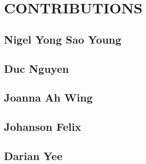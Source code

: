 \newpage
\section{CONTRIBUTIONS}
\subsection{Nigel Yong Sao Young}

\subsection{Duc Nguyen}

\subsection{Joanna Ah Wing}

\subsection{Johanson Felix}

\subsection{Darian Yee}
